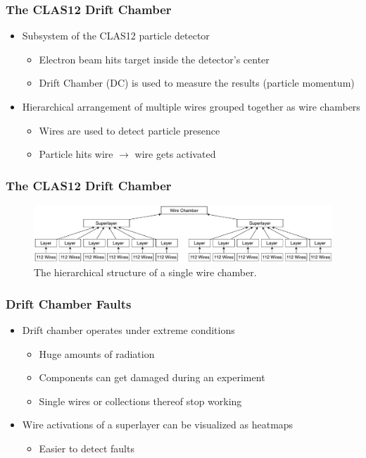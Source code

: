\begin{frame}
  \frametitle{The CLAS12 Drift Chamber}
  \begin{itemize}
    \item Subsystem of the CLAS12 particle detector
      \begin{itemize}
        \item Electron beam hits target inside the detector's center
        \item Drift Chamber (DC) is used to measure the results
          (particle momentum)
      \end{itemize}
    \item Hierarchical arrangement of multiple wires grouped together
      as wire chambers
      \begin{itemize}
        \item Wires are used to detect particle presence
        \item Particle hits wire \(\rightarrow\) wire gets activated
      \end{itemize}
  \end{itemize}
\end{frame}

\begin{frame}
  \frametitle{The CLAS12 Drift Chamber}
  \begin{figure}
    \includegraphics[width=\textwidth]{../figures/wire_chamber}
    \caption{The hierarchical structure of a single wire chamber.}
  \end{figure}
\end{frame}

\begin{frame}
  \frametitle{Drift Chamber Faults}
  \begin{itemize}
    \item Drift chamber operates under extreme conditions
      \begin{itemize}
        \item Huge amounts of radiation
        \item Components can get damaged during an experiment
        \item Single wires or collections thereof stop working
      \end{itemize}
    \item Wire activations of a superlayer can be visualized as
      heatmaps
      \begin{itemize}
        \item Easier to detect faults
      \end{itemize}
  \end{itemize}
\end{frame}

